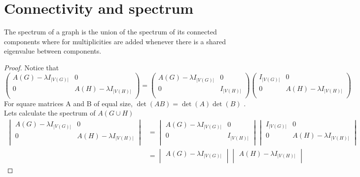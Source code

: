 \documentclass[a4paper, 11pt, oneside]{article}
\newenvironment{problem}[1]
  {\renewcommand\theinnercustomprob{#1}\innercustomprob}
  {\endinnercustomprob}
\newcommand\abs[1]{\left|#1\right|}
\begin{document}
\section{Connectivity and spectrum}

\begin{problem}{3.1}\label{problem3.1}
The spectrum of a graph is the union of the spectrum of its connected components where for multiplicities are added whenever there is a shared eigenvalue between components.
\end{problem}

\begin{proof}
Notice that
\begin{equation*}
\begin{pmatrix}
A(G) - \lambda I_{\abs{V(G)}} & 0 \\ 
0             & A(H) - \lambda I_{\abs{V(H)}} \\
\end{pmatrix} =
\begin{pmatrix}
A(G) - \lambda I_{\abs{V(G)}} & 0 \\ 
0             &  I_{\abs{V(H)}} \\
\end{pmatrix}
\begin{pmatrix}
 I_{\abs{V(G)}} & 0 \\ 
0             & A(H) - \lambda I_{\abs{V(H)}} \\
\end{pmatrix}
\end{equation*}
For square matrices A and B of equal size, $\det(AB)=\det(A)\det(B)$ \cite{determinant}.
Lets calculate the spectrum of $A(G\cup H)$ 
\begin{align*}
\begin{vmatrix}
A(G) - \lambda I_{\abs{V(G)}} & 0 \\ 
0             & A(H) - \lambda I_{\abs{V(H)}} \\
\end{vmatrix} &=
\begin{vmatrix}
A(G) - \lambda I_{\abs{V(G)}} & 0 \\ 
0             &  I_{\abs{V(H)}} \\
\end{vmatrix}
\begin{vmatrix}
 I_{\abs{V(G)}} & 0 \\ 
0             & A(H) - \lambda I_{\abs{V(H)}} \\
\end{vmatrix} \\&=
\begin{vmatrix}
A(G) - \lambda I_{\abs{V(G)}}\\
\end{vmatrix}
\begin{vmatrix}
A(H) - \lambda I_{\abs{V(H)}} \\
\end{vmatrix}
\end{align*}
\end{proof}
\end{document}
